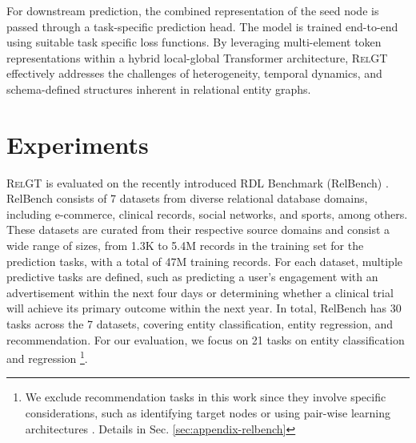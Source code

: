 \documentclass{article} %
\newcommand{\RelGT}{\textsc{RelGT}\xspace}
\begin{document}
For downstream prediction, the combined representation of the seed node is passed through a task-specific prediction head. The model is trained end-to-end using suitable task specific loss functions. By leveraging multi-element token representations within a hybrid local-global Transformer architecture, \RelGT effectively addresses the challenges of heterogeneity, temporal dynamics, and schema-defined structures inherent in relational entity graphs. 

\section{Experiments}
\label{sec:experiments}

\RelGT is evaluated on the recently introduced RDL Benchmark
(RelBench) \citep{robinson2025relbench}. RelBench consists of 7 datasets from diverse relational database domains, including e-commerce, clinical records, social networks, and sports, among others. These datasets are curated from their respective source domains and consist a wide range of sizes, from 1.3K to 5.4M records in the training set for the prediction tasks, with a total of 47M training records. 
For each dataset, multiple predictive tasks are defined, such as predicting a user's engagement with an advertisement within the next four days or determining whether a clinical trial will achieve its primary outcome within the next year. In total, RelBench has 30 tasks across the 7 datasets, covering entity classification, entity regression, and recommendation.
For our evaluation, we focus on 21 tasks on entity classification and regression
\footnote{We exclude recommendation tasks in this work since they involve specific considerations, such as identifying target nodes \citep{you2021identity} or using pair-wise learning architectures \citep{yuan2024contextgnn}. Details in Sec. \ref{sec:appendix-relbench}}.
\end{document}
